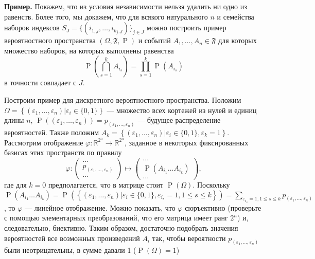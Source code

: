 \documentclass[12pt]{article}
\numberwithin{theorem}{section}
\theoremstyle{definition}
\newenvironment{example}{\indent \textbf{Пример.}}{\indent}
\newcommand{\prob}{\operatorname{P}}
\newcommand{\events}{\mathfrak{F}}
\newcommand{\defineset}[2]{\left\{
	\left.
	#1
	\right\vert
	#2
	\right\}}
\begin{document}
	\begin{example}
		Покажем, что из условия независимости нельзя удалить ни одно из равенств.
		Более того, мы докажем, что для всякого натурального $ n $ 
		и семейства наборов индексов $ S_{J} = \{(i_{1,j}, \ldots, i_{k_j,j})\}_{j \in J} $
		можно построить пример вероятностного пространства $ (\Omega, \events, \prob) $ 
		и событий $ A_1, \ldots, A_n \in \events $ 
		для которых множество наборов, на которых выполнены равенства
		$$ \prob\left(\bigcap\limits_{s = 1}^{k} A_{i_s}\right) = \prod_{s = 1}^{k} \prob(A_{i_s}) $$
		в точности совпадает с $ J $.
		
		Построим пример для дискретного вероятностного пространства.
		Положим $ \Omega = \defineset{(\varepsilon_1, \ldots, \varepsilon_n)}{\varepsilon_i \in \{0, 1\}} $
		--- множество всех кортежей из нулей и единиц длины $ n $,
		$ \prob((\varepsilon_1, \ldots, \varepsilon_n)) = p_{(\varepsilon_1, \ldots, \varepsilon_n)} $
		--- будущее распределение вероятностей.
		Также положим 
		$ A_k = \defineset{(\varepsilon_1, \ldots, \varepsilon_n)}{\varepsilon_i \in \{0, 1\}, \varepsilon_k = 1} $.
		Рассмотрим отображение 
		$ \varphi \colon \mathbb{R}^{2^n} \to \mathbb{R}^{2^n} $,
		заданное в некоторых фиксированных базисах этих пространств по правилу 
		$$ \varphi\colon 
		\left( \begin{matrix}
			\ldots \\
			p_{(\varepsilon_1, \ldots, \varepsilon_n)} \\
			\ldots
		\end{matrix} \right)
		\mapsto 
		\left( \begin{matrix}
			\ldots \\
			\prob(A_{i_1}\ldots A_{i_k}) \\
			\ldots
		\end{matrix} \right), $$
		где для $ k = 0 $ предполагается, что в матрице стоит $ \prob(\Omega) $.
		Поскольку $ \prob(A_{i_1}\ldots A_{i_k}) = 
		\prob(\defineset{(\varepsilon_1, \ldots, \varepsilon_n)}{\varepsilon_i \in \{0, 1\}, 
			\varepsilon_{i_s} = 1, 1 \leqslant s \leqslant k})
		= \sum\limits_{\varepsilon_{i_s} = 1, 1 \leqslant s \leqslant k} p_{(\varepsilon_1, \ldots, \varepsilon_n)} $,
		то $ \varphi $ --- линейное отображение.
		Можно показать, что $ \varphi $ сюръективно (проверьте с помощью элементарных преобразований, 
		что его матрица имеет ранг $ 2^n $) и, следовательно, биективно.
		Таким образом, достаточно подобрать значения вероятностей все возможных произведений $ A_i $ так, чтобы
		вероятности $ p_{(\varepsilon_1, \ldots, \varepsilon_n)} $ были неотрицательны, в сумме давали 1 ($ \prob(\Omega) = 1 $)

\end{example}
\end{document}
